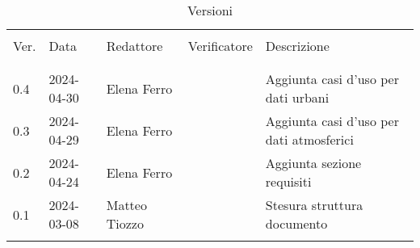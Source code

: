 \documentclass[12pt]{article}
\begin{document}


\newpage



\captionsetup[table]{list=no}
\begin{table}[!h]
	\footnotesize
	\begin{center}
		\caption*{Versioni}
		\vspace{0.5cm}
		\begin{tabular}{ l l l l p{6.1cm} }
			\hline                                                                                      \\[-2ex]
			Ver. & Data       & Redattore     & Verificatore & Descrizione                              \\
			\\[-2ex] \hline \\[-1.5ex]
			0.4  & 2024-04-30 & Elena Ferro   &              & Aggiunta casi d'uso per dati urbani      \\
			0.3  & 2024-04-29 & Elena Ferro   &              & Aggiunta casi d'uso per dati atmosferici \\
			0.2  & 2024-04-24 & Elena Ferro   &              & Aggiunta sezione requisiti               \\
			0.1  & 2024-03-08 & Matteo Tiozzo &              & Stesura struttura documento              \\
			\\[-1.5ex] \hline
		\end{tabular}
	\end{center}
\end{table}
\captionsetup[table]{list=yes}

\newpage

\tableofcontents
\listoftables
\listoffigures

\newpage








\end{document}
